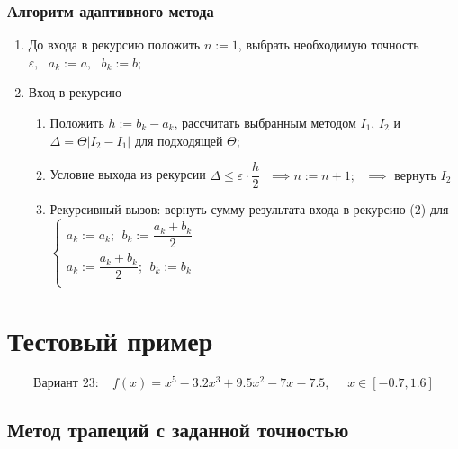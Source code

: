 \documentclass[a4paper, 14pt]{article}
\begin{document}
\subsubsection{Алгоритм адаптивного метода}
\begin{enumerate}
    \item До входа в рекурсию положить $n:=1$, выбрать необходимую точность $\varepsilon,~~~a_k := a, ~~~b_k := b$;

    \item Вход в рекурсию \begin{enumerate}
        \item Положить $h:=b_k-a_k$, рассчитать выбранным методом $I_1$, $I_2$ и  $\Delta = \Theta\left|I_2 - I_1\right|$ для подходящей $\Theta$;
        \item Условие выхода из рекурсии $\Delta \le \varepsilon\cdot\dfrac{h}{2} ~~~ \implies n:=n+1; ~~~ \implies \text{ вернуть } I_2$
        \item Рекурсивный вызов: вернуть сумму результата входа в рекурсию (2) для $\begin{cases}
            a_k:=a_k;~~ b_k:= \dfrac{a_k+b_k}{2}\\
            a_k:=\dfrac{a_k+b_k}{2};~~ b_k:=b_k \\
        \end{cases}$
    \end{enumerate}
\end{enumerate}


\section{Тестовый пример}
\begin{equation}
    \text{Вариант 23:}~~~~~f(x) = x^5 - 3.2x^3 + 9.5x^2 - 7x - 7.5,~~~~~~x \in [-0.7, 1.6]
\end{equation}
\subsection{Метод трапеций с заданной точностью}
\end{document}
